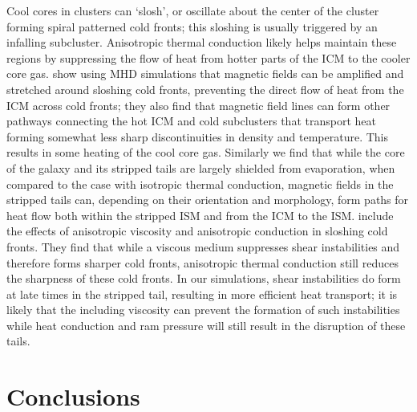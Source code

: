 \documentclass[twocolumn]{aastex6}
\begin{document}
Cool cores in clusters can `slosh', or oscillate about the center of the cluster forming spiral patterned cold fronts; this sloshing is usually triggered by an infalling subcluster. Anisotropic thermal conduction likely helps maintain these regions by suppressing the flow of heat from hotter parts of the ICM to the cooler core gas. \citet{ZuHone13} show using MHD simulations that magnetic fields can be amplified and stretched around sloshing cold fronts, preventing the direct flow of heat from the ICM across cold fronts; they also find that magnetic field lines can  form other pathways connecting the hot ICM and cold subclusters that transport heat forming somewhat less sharp discontinuities in density and temperature. This results in some heating of the cool core gas. Similarly we find that while the core of the galaxy and its stripped tails are largely shielded from evaporation, when compared to the case with isotropic thermal conduction, magnetic fields in the stripped tails can, depending on their orientation and morphology, form paths for heat flow both within the stripped ISM and from the ICM to the ISM. \citet{ZuHone15} include the effects of anisotropic viscosity and anisotropic conduction in sloshing cold fronts. They find that while a viscous medium suppresses shear instabilities and therefore forms sharper cold fronts, anisotropic thermal conduction still reduces the sharpness of these cold fronts. In our simulations, shear instabilities do form at late times in the stripped tail, resulting in more efficient heat transport; it is likely that the including viscosity can prevent the formation of such instabilities while heat conduction and ram pressure will still result in the disruption of these tails. 

 

\section{Conclusions}
\label{sec:conclusions}
\end{document}
